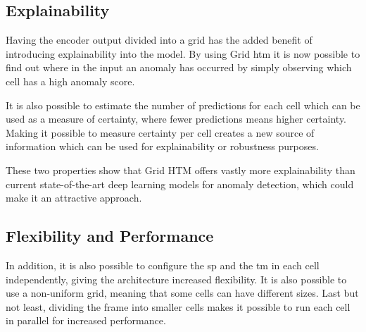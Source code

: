 \subsection{Explainability}
Having the encoder output divided into a grid has the added benefit of introducing explainability into the model. By using Grid \gls*{htm} it is now possible to find out where in the input an anomaly has occurred by simply observing which cell has a high anomaly score.
\par
It is also possible to estimate the number of predictions for each cell which can be used as a measure of certainty, where fewer predictions means higher certainty. Making it possible to measure certainty per cell creates a new source of information which can be used for explainability or robustness purposes.
\par
These two properties show that Grid HTM offers vastly more explainability than current state-of-the-art deep learning models for anomaly detection, which could make it an attractive approach.
\subsection{Flexibility and Performance}
In addition, it is also possible to configure the \gls*{sp} and the \gls*{tm} in each cell independently, giving the architecture increased flexibility. It is also possible to use a non-uniform grid, meaning that some cells can have different sizes. Last but not least, dividing the frame into smaller cells makes it possible to run each cell in parallel for increased performance.
